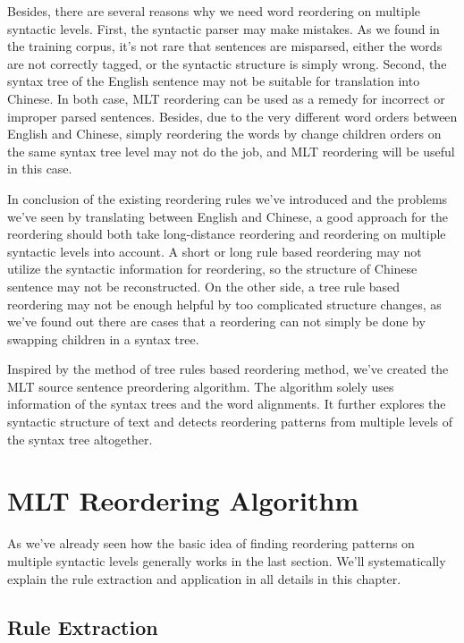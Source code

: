 Besides, there are several reasons why we need word reordering on multiple syntactic levels. First, the syntactic parser may make mistakes. As we found in the training corpus, it's not rare that sentences are misparsed, either the words are not correctly tagged, or the syntactic structure is simply wrong. Second, the syntax tree of the English sentence may not be suitable for translation into Chinese. In both case, \ac{MLT} reordering can be used as a remedy for incorrect or improper parsed sentences. Besides, due to the very different word orders between English and Chinese, simply reordering the words by change children orders on the same syntax tree level may not do the job, and \ac{MLT} reordering will be useful in this case.

In conclusion of the existing reordering rules we've introduced and the problems we've seen by translating between English and Chinese, a good approach for the reordering should both take long-distance reordering and reordering on multiple syntactic levels into account. A short or long rule based reordering may not utilize the syntactic information for reordering, so the structure of Chinese sentence may not be reconstructed. On the other side, a tree rule based reordering may not be enough helpful by too complicated structure changes, as we've found out there are cases that a reordering can not simply be done by swapping children in a syntax tree. 

Inspired by the method of tree rules based reordering method, we've created the \ac{MLT} source sentence preordering algorithm. The algorithm solely uses information of the syntax trees and the word alignments. It further explores the syntactic structure of text and detects reordering patterns from multiple levels of the syntax tree altogether.

\section{\ac{MLT} Reordering Algorithm}
\label{ch:ReorderingApproach:sec:Algorithm}

As we've already seen how the basic idea of finding reordering patterns on multiple syntactic levels generally works in the last section. We'll systematically explain the rule extraction and application in all details in this chapter.

\subsection{Rule Extraction}

